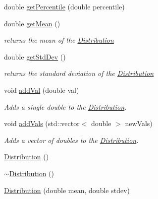 \begin{DoxyCompactItemize}
\item 
double \mbox{\hyperlink{class_world_architect_1_1_distribution_a2a692fa51284c64fd37476e7d6b1376e}{get\+Percentile}} (double percentile)
\item 
double \mbox{\hyperlink{class_world_architect_1_1_distribution_ab73d4ad1b0fb08c1fc9fe4c4973ff853}{get\+Mean}} ()
\begin{DoxyCompactList}\small\item\em returns the mean of the \mbox{\hyperlink{class_world_architect_1_1_distribution}{Distribution}} \end{DoxyCompactList}\item 
double \mbox{\hyperlink{class_world_architect_1_1_distribution_a835105360b0c7da1a0eec0943963f0d7}{get\+Std\+Dev}} ()
\begin{DoxyCompactList}\small\item\em returns the standard deviation of the \mbox{\hyperlink{class_world_architect_1_1_distribution}{Distribution}} \end{DoxyCompactList}\item 
void \mbox{\hyperlink{class_world_architect_1_1_distribution_a406368b730c3a22d7cbc84d1a00f544e}{add\+Val}} (double val)
\begin{DoxyCompactList}\small\item\em Adds a single double to the \mbox{\hyperlink{class_world_architect_1_1_distribution}{Distribution}}. \end{DoxyCompactList}\item 
void \mbox{\hyperlink{class_world_architect_1_1_distribution_a42bcb9543c69fb3b07f84038a9344dae}{add\+Vals}} (std\+::vector$<$ double $>$ new\+Vals)
\begin{DoxyCompactList}\small\item\em Adds a vector of doubles to the \mbox{\hyperlink{class_world_architect_1_1_distribution}{Distribution}}. \end{DoxyCompactList}\item 
\mbox{\hyperlink{class_world_architect_1_1_distribution_ada837c9a1da728290d6bbea0bb6b266f}{Distribution}} ()
\item 
\mbox{\hyperlink{class_world_architect_1_1_distribution_a68522687bdcca605cce35adb68afdcac}{$\sim$\+Distribution}} ()
\item 
\mbox{\hyperlink{class_world_architect_1_1_distribution_ae8b48b89df0dbc5d326b22789a014a3a}{Distribution}} (double mean, double stdev)
\end{DoxyCompactItemize}


